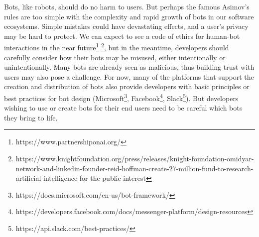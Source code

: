 \documentclass{sig-alternate}
\begin{document}
	Bots, like robots, should do no harm to users.  
	But perhaps the famous Asimov's rules are too simple with the complexity and rapid growth of bots in our software ecosystems.  Simple mistakes could have devastating effects, and a user's privacy may be hard to protect.  
	We can expect to see a code of ethics for human-bot interactions in the near future\footnote{https://www.partnershiponai.org/} \footnote{https://www.knightfoundation.org/press/releases/knight-foundation-omidyar-network-and-linkedin-founder-reid-hoffman-create-27-million-fund-to-research-artificial-intelligence-for-the-public-interest}, but in the meantime, developers should carefully consider how their bots may be misused, either intentionally or unintentionally. Many bots are already seen as malicious, thus building trust with users may also pose a challenge. 
	For now, many of the platforms that support the creation and distribution of bots also provide developers with basic principles or best practices for bot design (Microsoft\footnote{https://docs.microsoft.com/en-us/bot-framework/}, Facebook\footnote{https://developers.facebook.com/docs/messenger-platform/design-resources}, Slack\footnote{https://api.slack.com/best-practices/}).
	But developers wishing to use or create bots for their end users need to be careful which bots they bring to life.
	
\end{document}
